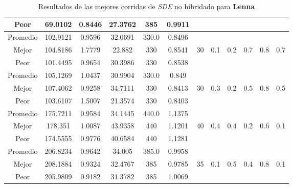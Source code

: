 \begin{table}[h!]
\begin{center}
\begin{tabular}{|c|c|c|c|c|c|c|c|c|c|c|c|}
            \cline{1-6}
            Peor & 69.0102 & 0.8446  & 27.3762 & 385 & 0.9911 &  &  &  &  &  & \\
        \hline
        \hline
            Promedio  & 102.9121 & 0.9596 & 32.0691 & 330.0 & 0.8496 &  &  &  &  &  & \\
            \cline{1-6}
            Mejor & 104.8186 & 1.7779  & 22.882 & 330 & 0.8541 & 30 & 0.1 & 0.2 & 0.7 & 0.8 & 0.7\\
            \cline{1-6}
            Peor & 101.4495 & 0.9654  & 30.3986 & 330 & 0.8538 &  &  &  &  &  & \\
        \hline
        \hline
            Promedio  & 105.1269 & 1.0437 & 30.9904 & 330.0 & 0.849 &  &  &  &  &  & \\
            \cline{1-6}
            Mejor & 107.4062 & 0.9258  & 34.7111 & 330 & 0.8413 & 30 & 0.3 & 0.2 & 0.5 & 0.8 & 0.5\\
            \cline{1-6}
            Peor & 103.6107 & 1.5007  & 21.3574 & 330 & 0.8403 &  &  &  &  &  & \\
        \hline
        \hline
            Promedio  & 175.7211 & 0.9584 & 34.1445 & 440.0 & 1.1375 &  &  &  &  &  & \\
            \cline{1-6}
            Mejor & 178.351 & 1.0087  & 43.9358 & 440 & 1.1201 & 40 & 0.4 & 0.4 & 0.2 & 0.6 & 0.1\\
            \cline{1-6}
            Peor & 174.5555 & 0.9776  & 40.6584 & 440 & 1.1281 &  &  &  &  &  & \\
        \hline
        \hline
            Promedio  & 206.8234 & 0.9642 & 34.005 & 385.0 & 0.9958 &  &  &  &  &  & \\
            \cline{1-6}
            Mejor & 208.1884 & 0.9324  & 32.4767 & 385 & 0.9785 & 35 & 0.1 & 0.5 & 0.4 & 0.8 & 0.1\\
            \cline{1-6}
            Peor & 205.9809 & 0.9182  & 31.3782 & 385 & 1.0069 &  &  &  &  &  & \\
        \hline
        \end{tabular}
        \caption{Resultados de las mejores corridas de \emph{SDE} no hibridado para {\bf Lenna}}
        \label{tb:tablesdealgimg}
    \end{center}
\end{table}


